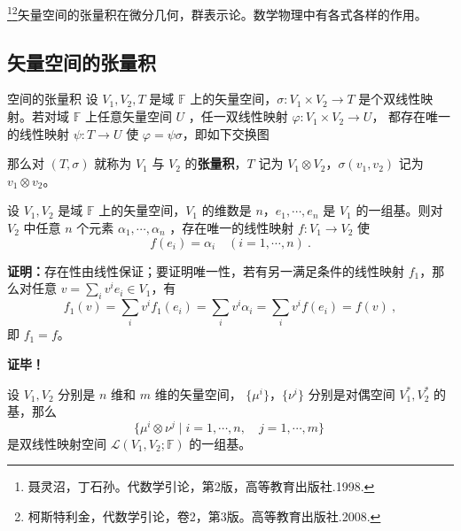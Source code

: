

\footnote{聂灵沼，丁石孙。代数学引论，第2版，高等教育出版社.1998.}\footnote{柯斯特利金，代数学引论，卷2，第3版。高等教育出版社.2008.}矢量空间的张量积在微分几何，群表示论。数学物理中有各式各样的作用。

\subsection{矢量空间的张量积}
\begin{definition}{空间的张量积}\label{def_TPofSp_1}
设 $V_1, V_2,T$ 是域 $\mathbb F$ 上的矢量空间，$\sigma: V_1 \times V_2 \rightarrow T$ 是个双线性映射。若对域 $\mathbb F$ 上任意矢量空间 $U$ ，任一双线性映射 $\varphi:V_1\times V_2\rightarrow U$， 都存在唯一的线性映射 $\psi:T\rightarrow U$ 使 $\varphi=\psi\sigma$，即如下交换图
\begin{equation}
\end{equation}

那么对 $(T, \sigma)$ 就称为 $V_1$ 与 $V_2$ 的\textbf{张量积}，$T$ 记为 $V_1 \otimes V_2$，$\sigma(v_1, v_2)$ 记为 $v_1 \otimes v_2$。
\end{definition}

\begin{lemma}{}\label{lem_TPofSp_2}
设 $V_1,V_2$ 是域 $\mathbb F$ 上的矢量空间，$V_1$ 的维数是 $n$，$e_1,\cdots,e_n$ 是 $V_1$ 的一组基。则对 $V_2$ 中任意 $n$ 个元素 $\alpha_1,\cdots,\alpha_n$ ，存在唯一的线性映射 $f:V_1\rightarrow V_2$ 使
\begin{equation}
f(e_i)=\alpha_i\quad (i=1,\cdots,n)~.
\end{equation}
\end{lemma}
\textbf{证明：}存在性由线性保证；要证明唯一性，若有另一满足条件的线性映射 $f_1$，那么对任意 $v=\sum\limits_{i}v^ie_i\in V_1$，有
\begin{equation}
f_1(v)=\sum_{i}v^if_1(e_i)=\sum_{i}v^i\alpha_i=\sum_{i}v^if(e_i)=f(v)~,
\end{equation}
即 $f_1=f$。

\textbf{证毕！}

\begin{lemma}{}\label{lem_TPofSp_1}
设 $V_1,V_2$ 分别是 $n$ 维和 $m$ 维的矢量空间， $\{\mu^i\}$，$\{\nu^i\}$ 分别是对偶空间 $V_1^*,V_2^*$ 的基，那么
\begin{equation}\label{eq_TPofSp_1}
\{\mu^i\otimes\nu^j \mid i=1,\cdots,n,\quad j=1,\cdots,m \}~
\end{equation}
是双线性映射空间 $\mathcal L(V_1,V_2;\mathbb F)$ 的一组基。
\end{lemma}

